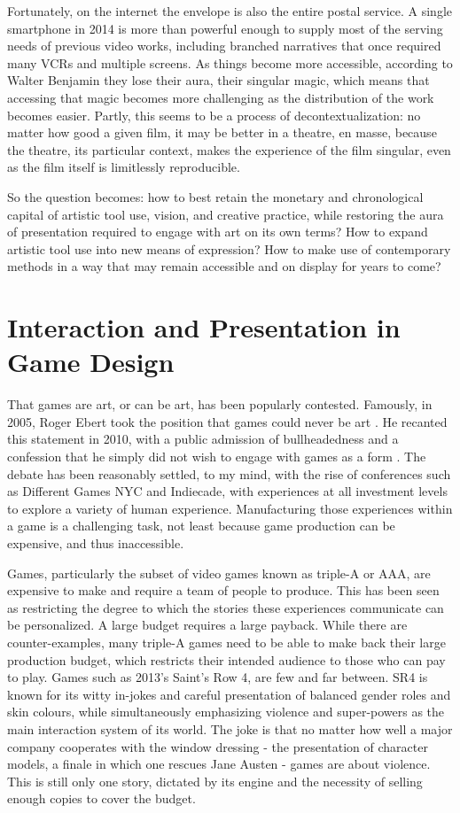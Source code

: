 Fortunately, on the internet the envelope is also the entire postal service. A single smartphone in 2014 is more than powerful enough to supply most of the serving needs of previous video works, including branched narratives that once required many VCRs and multiple screens. As things become more accessible, according to Walter Benjamin \parencite{benjamin} they lose their aura, their singular magic, which means that accessing that magic becomes more challenging as the distribution of the work becomes easier. Partly, this seems to be a process of decontextualization: no matter how good a given film, it may be better in a theatre, en masse, because the theatre, its particular context, makes the experience of the film singular, even as the film itself is limitlessly reproducible.

So the question becomes: how to best retain the monetary and chronological capital of artistic tool use, vision, and creative practice, while restoring the aura of presentation required to engage with art on its own terms? How to expand artistic tool use into new means of expression? How to make use of contemporary methods in a way that may remain accessible and on display for years to come?
 
\section{Interaction and Presentation in Game Design}
That games are art, or can be art, has been popularly contested. Famously, in 2005, Roger Ebert took the position that games could never be art \parencite{ebert1}. He recanted this statement in 2010, with a public admission of bullheadedness and a confession that he simply did not wish to engage with games as a form \parencite{ebert2}. The debate has been reasonably settled, to my mind, with the rise of conferences such as Different Games NYC and Indiecade, with experiences at all investment levels to explore a variety of human experience. Manufacturing those experiences within a game is a challenging task, not least because game production can be expensive, and thus inaccessible. 

Games, particularly the subset of video games known as triple-A or AAA, are expensive to make and require a team of people to produce. This has been seen as restricting the degree to which the stories these experiences communicate can be personalized. A large budget requires a large payback. While there are counter-examples, many triple-A games need to be able to make back their large production budget, which restricts their intended audience to those who can pay to play. Games such as 2013's Saint's Row 4, \parencite{saintsrow} are few and far between. SR4 is known for its witty in-jokes and careful presentation of balanced gender roles and skin colours, while simultaneously emphasizing violence and super-powers as the main interaction system of its world. The joke is that no matter how well a major company cooperates with the window dressing - the presentation of character models, a finale in which one rescues Jane Austen - games are about violence. This is still only one story, dictated by its engine and the necessity of selling enough copies to cover the budget.

